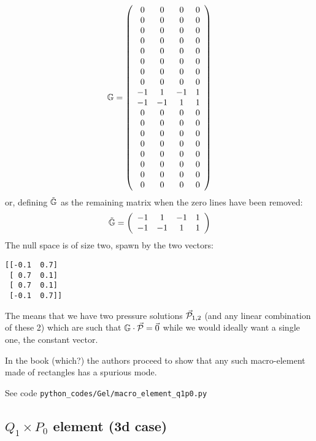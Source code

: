 \[
{\mathbb{G}} = 
\left(
\begin{array}{cccc}
  0  &   0 &   0 &   0  \\ 
  0  &   0 &   0 &   0  \\ 
  0  &   0 &   0 &   0  \\ 
  0  &   0 &   0 &   0  \\ 
  0  &   0 &   0 &   0  \\ 
  0  &   0 &   0 &   0  \\ 
  0  &   0 &   0 &   0  \\ 
  0  &   0 &   0 &   0  \\ 
 -1  &   1 &  -1 &   1  \\ 
 -1  &  -1 &   1 &   1  \\ 
  0  &   0 &   0 &   0  \\ 
  0  &   0 &   0 &   0  \\ 
  0  &   0 &   0 &   0  \\ 
  0  &   0 &   0 &   0  \\ 
  0  &   0 &   0 &   0  \\ 
  0  &   0 &   0 &   0  \\ 
  0  &   0 &   0 &   0  \\ 
  0  &   0 &   0 &   0  
\end{array}
\right)
\]
or, defining $\tilde{{\mathbb{G}}}$ as the remaining matrix when the zero lines have been removed:
\[
\tilde{{\mathbb{G}}} = 
\left(
\begin{array}{cccc}
 -1  &   1 &  -1 &   1  \\ 
 -1  &  -1 &   1 &   1  
\end{array}
\right)
\]
The null space is of size two, spawn by the two vectors:
\begin{verbatim}
[[-0.1  0.7]
 [ 0.7  0.1]
 [ 0.7  0.1]
 [-0.1  0.7]]
\end{verbatim}

The means that we have two pressure solutions $\vec{\cal P}_{1,2}$ (and any linear combination of these 2) 
which are such that ${\mathbb{G}}\cdot\vec{\cal P}=\vec{0}$
while we would ideally want a single one, the constant vector.

In the book (which?) the authors proceed to show that any such macro-element
made of rectangles has a spurious mode.

See code {\tt python\_codes/Gel/macro\_element\_q1p0.py}


\subsection{$Q_1\times P_0$ element (3d case)}

